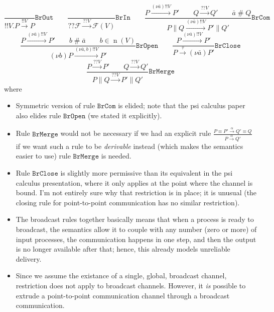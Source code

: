 \documentclass{article}
\newcommand{\bOut}{{!\!!}}
\newcommand{\bInp}{{?\!?}}
\newcommand{\new}[2]{(\nu\!#1) #2}
\newcommand{\freshFor}{\mathrel{\#}}
\DeclareMathOperator{\n}{n}
\begin{document}
\begin{itemize}
\begin{equation*}
%
%
\frac{
}{
\bOut V. P \xrightarrow{\bOut V} P
}
\mathtt{BrOut}
%
\qquad
%
%
\frac{
}{
\bInp \mathcal{F} \xrightarrow{\bInp V} \mathcal{F}(V)
}
\mathtt{BrIn}
%
\qquad
%
%
\frac{
P \xrightarrow{\new{\bar{a}}{\bOut V}} P' \qquad
Q \xrightarrow{\bInp V} Q' \qquad
\bar{a} \freshFor Q
}{
P \parallel Q \xrightarrow{\new{\bar{a}}{\bOut V}} P' \parallel Q'
}
\mathtt{BrCom}
\end{equation*}
%
\begin{equation*}
%
%
\frac{
P \xrightarrow{\new{\bar{a}}{\bOut V}} P' \qquad
b \freshFor \bar{a} \qquad
b \in \n(V)
}{
\new{b}{P} \xrightarrow{\new{\bar{a},b}{\bOut V}} P'
}
\mathtt{BrOpen}
%
\qquad
%
%
\frac{
P \xrightarrow{\new{\bar{a}}{\bOut V}} P'
}{
P \xrightarrow{\tau} \new{\bar{a}}{P'}
}
\mathtt{BrClose}
\end{equation*}
%
\begin{equation*}
%
%
\frac{
P \xrightarrow{\bInp V} P' \qquad
Q \xrightarrow{\bInp V} Q'
}{
P \parallel Q \xrightarrow{\bInp V} P' \parallel Q'
}
\mathtt{BrMerge}
\end{equation*}
%
where
%
\begin{itemize}
\item Symmetric version of rule $\mathtt{BrCom}$ is elided; note that the psi
calculus paper also elides rule $\mathtt{BrOpen}$ (we stated it explicitly).
\item Rule $\mathtt{BrMerge}$ would not be necessary if we had an explicit rule
\begin{math}
\displaystyle
\frac{
P \equiv P' \xrightarrow{\alpha} Q' \equiv Q
}{
P \xrightarrow{\alpha} Q'
}
\end{math}
if we want such a rule to be \emph{derivable} instead (which makes the semantics
easier to use) rule $\mathtt{BrMerge}$ is needed.
\item Rule $\mathtt{BrClose}$ is slightly more permissive than its equivalent in
the psi calculus presentation, where it only applies at the point where the
channel is bound. I'm not entirely sure why that restriction is in place; it
is unusual (the closing rule for point-to-point communication has no similar
restriction).
\item The broadcast rules together basically means that when a process is ready
to broadcast, the semantics allow it to couple with any number (zero or more)
of input processes, the communication happens in one step, and then the output
is no longer available after that; hence, this already models unreliable
delivery.
\item Since we assume the existance of a single, global, broadcast channel,
restriction does not apply to broadcast channels. However, it \emph{is} possible
to extrude a point-to-point communication channel through a broadcast communication.
\end{itemize}


\end{itemize}
\end{document}
